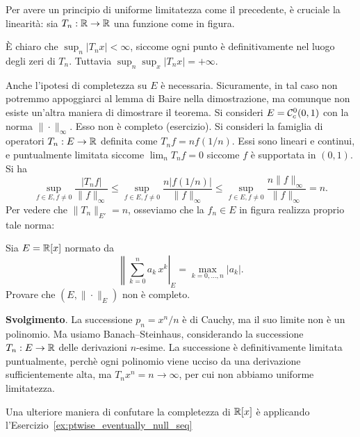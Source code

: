 \begin{counterexample}
	Per avere un principio di uniforme limitatezza come il precedente, è cruciale la linearità: sia $T_n:\mathbb{R} \to \mathbb{R}$ una funzione come in figura.

	\begin{figure}[H]
		\centering
	\end{figure}

	È chiaro che $\sup_n |T_n x| < \infty$, siccome ogni punto è definitivamente nel luogo degli zeri di $T_n$. Tuttavia $\sup_n \sup_x |T_n x| = + \infty$.
\end{counterexample}

\begin{counterexample}
	Anche l'ipotesi di completezza su $E$ è necessaria. Sicuramente, in tal caso non potremmo appoggiarci al lemma di Baire nella dimostrazione, ma comunque non esiste un'altra maniera di dimostrare il teorema.
	Si consideri $E = \mathcal{C}^0_c(0,1)$ con la norma $\|\cdot\|_\infty$. Esso non è completo (esercizio). Si consideri la famiglia di operatori $T_n : E \to \mathbb{R}$ definita come $T_nf = n f(1/n)$. Essi sono lineari e continui, e puntualmente limitata siccome $\lim_n T_n f = 0$ siccome $f$ è supportata in $(0,1)$. Si ha
	\begin{equation*}
		\sup_{f \in E, f \neq 0} \frac{|T_n f|}{\|f\|_\infty} \leq \sup_{f \in E, f \neq 0} \frac{n|f(1/n)|}{\|f\|_\infty} \leq \sup_{f \in E, f \neq 0} \frac{n\|f\|_\infty}{\|f\|_\infty} = n.
	\end{equation*}
	Per vedere che $\|T_n\|_{E'} = n$, osseviamo che la $f_n \in E$ in figura realizza proprio tale norma:

	\begin{figure}[H]
		\centering
	\end{figure}
\end{counterexample}

\begin{exercise}
	Sia $E = \mathbb{R}[x]$ normato da
	\begin{equation*}
		\left\|\sum_{k=0}^n a_k\,x^k\right|_E = \max_{k = 0, \ldots, n} |a_k|.
	\end{equation*}
	Provare che $(E, \|\cdot\|_E)$ non è completo.

	\noindent\textbf{Svolgimento}. La successione $p_n = x^n/n$ è di Cauchy, ma il suo limite non è un polinomio. Ma usiamo Banach--Steinhaus, considerando la successione $T_n : E \to \mathbb{R}$ delle derivazioni $n$-esime. La successione è definitivamente limitata puntualmente, perchè ogni polinomio viene ucciso da una derivazione sufficientemente alta, ma $T_n x^n = n \to \infty$, per cui non abbiamo uniforme limitatezza.

	Una ulteriore maniera di confutare la completezza di $\mathbb{R}[x]$ è applicando l'Esercizio~\ref{ex:ptwise_eventually_null_seq}
\end{exercise}

